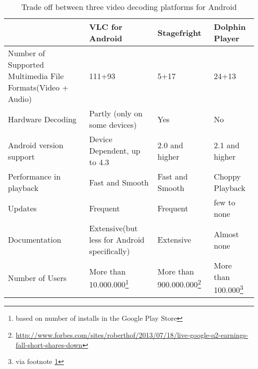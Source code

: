 \begin{savenotes}
\begin{table}[h]
\caption{Trade off between three video decoding platforms for Android \label{tab:vid_dec_table}}
	\begin{tabularx}{\textwidth}{| X|X|X|X |}
	\hline
	& VLC for Android & Stagefright & Dolphin Player \\ \hline
	Number of Supported Multimedia File Formats(Video + Audio)
	& 111+93
	& 5+17
	& 24+13 \\ \hline
	Hardware Decoding 
	& Partly (only on some devices)
	& Yes
	& No \\ \hline
	Android version support
	& Device Dependent, up to 4.3
	& 2.0 and higher
	& 2.1 and higher \\ \hline
	Performance in playback
	& Fast and Smooth
	& Fast and Smooth
	& Choppy Playback \\ \hline
	Updates
	& Frequent
	& Frequent
	& few to none \\ \hline
	Documentation
	& Extensive(but less for Android specifically)
	& Extensive
	& Almost none \\ \hline
	Number of Users
	& More than 10.000.000\footnote{\label{install}based on number of installs in the Google Play Store}
	& More than 900.000.000\footnote{\url{http://www.forbes.com/sites/roberthof/2013/07/18/live-google-q2-earnings-fall-short-shares-down}}
	& More than 100.000\footnote{via footnote \ref{install}} \\ \hline
	\end{tabularx}
\end{table}
\end{savenotes}



